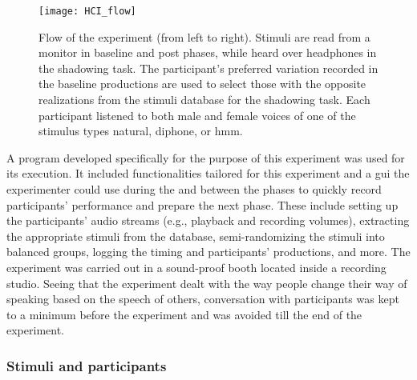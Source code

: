 %
\begin{figure}[t]
	\centering
	\texttt{[image: HCI\_flow]}
	\caption[\acs{hci} convergence experiment workflow]
		{Flow of the experiment (from left to right).
		Stimuli are read from a monitor in baseline and post phases, while heard over headphones in the shadowing task.
		The participant's preferred variation recorded in the baseline productions are used to select those with the opposite realizations from the stimuli database for the shadowing task.
		Each participant listened to both male and female voices of one of the stimulus types natural, diphone, or \acs{hmm}.}
	\label{fig:HCIConvFlow}
\end{figure}
%
A program developed specifically for the purpose of this experiment was used for its execution.
It included functionalities tailored for this experiment and a \ac{gui} the experimenter could use during the and between the phases to quickly record participants' performance and prepare the next phase.
These include setting up the participants' audio streams (e.g., playback and recording volumes), extracting the appropriate stimuli from the database, semi-randomizing the stimuli into balanced groups, logging the timing and participants' productions, and more.
The experiment was carried out in a sound-proof booth located inside a recording studio.
Seeing that the experiment dealt with the way people change their way of speaking based on the speech of others, conversation with participants was kept to a minimum before the experiment and was avoided till the end of the experiment.

\subsubsection{Stimuli and participants}
\label{subsubsec:stimuli_participant_hci}

